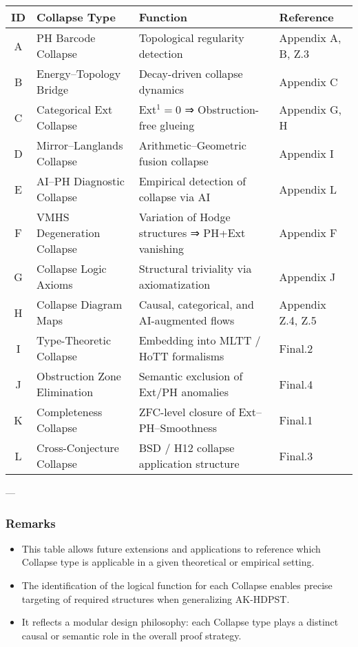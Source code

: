 \documentclass[11pt]{article}
\begin{document}
\begin{axiom}
\begin{axiom}
{{\begin{center}
\renewcommand{\arraystretch}{1.3}
\begin{tabular}{|c|l|l|l|}
\hline
\textbf{ID} & \textbf{Collapse Type} & \textbf{Function} & \textbf{Reference} \\
\hline
A & PH Barcode Collapse & Topological regularity detection & Appendix A, B, Z.3 \\
B & Energy–Topology Bridge & Decay-driven collapse dynamics & Appendix C \\
C & Categorical Ext Collapse & Ext$^1 = 0$ ⇒ Obstruction-free glueing & Appendix G, H \\
D & Mirror–Langlands Collapse & Arithmetic–Geometric fusion collapse & Appendix I \\
E & AI–PH Diagnostic Collapse & Empirical detection of collapse via AI & Appendix L \\
F & VMHS Degeneration Collapse & Variation of Hodge structures ⇒ PH+Ext vanishing & Appendix F \\
G & Collapse Logic Axioms & Structural triviality via axiomatization & Appendix J \\
H & Collapse Diagram Maps & Causal, categorical, and AI-augmented flows & Appendix Z.4, Z.5 \\
I & Type-Theoretic Collapse & Embedding into MLTT / HoTT formalisms & Final.2 \\
J & Obstruction Zone Elimination & Semantic exclusion of Ext/PH anomalies & Final.4 \\
K & Completeness Collapse & ZFC-level closure of Ext–PH–Smoothness & Final.1 \\
L & Cross-Conjecture Collapse & BSD / H12 collapse application structure & Final.3 \\
\hline
\end{tabular}
\end{center}

---

\subsubsection*{Remarks}

\begin{itemize}
  \item This table allows future extensions and applications to reference  
  which Collapse type is applicable in a given theoretical or empirical setting.
  \item The identification of the logical function for each Collapse enables  
  precise targeting of required structures when generalizing AK-HDPST.
  \item It reflects a modular design philosophy: each Collapse type plays a  
  distinct causal or semantic role in the overall proof strategy.
\end{itemize}

}}
\end{axiom}
\end{axiom}
\end{document}
